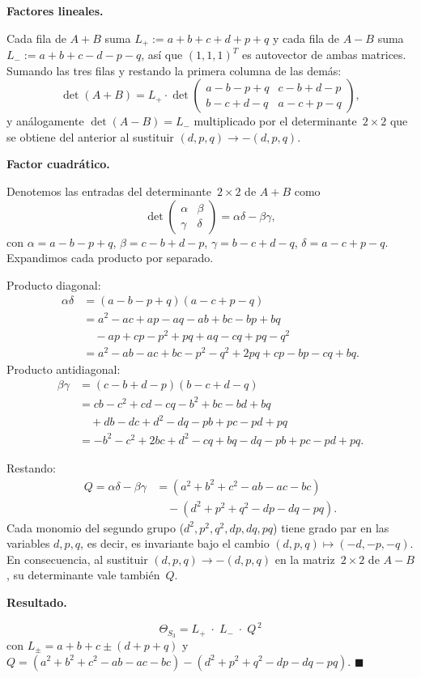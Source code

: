 \documentclass[10pt,a4paper]{article}
\newcommand{\blockhead}[2][repteal]{%
  \par\smallskip
  {\color{#1}\bfseries #2.}\par\nobreak\smallskip
}
\newcommand{\subhead}[1]{\blockhead{#1}}
\begin{document}
\subhead{Factores lineales}
Cada fila de $A+B$ suma $L_+:=a{+}b{+}c{+}d{+}p{+}q$
y cada fila de $A-B$ suma $L_-:=a{+}b{+}c{-}d{-}p{-}q$,
así que $(1,1,1)^{T}$ es autovector de ambas matrices.
Sumando las tres filas y restando la primera columna de las demás:
\[
  \det(A+B)=L_+\cdot\det
  \begin{pmatrix}
    a{-}b{-}p{+}q & c{-}b{+}d{-}p\\
    b{-}c{+}d{-}q & a{-}c{+}p{-}q
  \end{pmatrix},
\]
y análogamente $\det(A-B)=L_-$ multiplicado por el determinante~$2\times 2$
que se obtiene del anterior al sustituir $(d,p,q)\to-(d,p,q)$.

\subhead{Factor cuadrático}
Denotemos las entradas del determinante~$2\times 2$ de $A+B$ como
\[
  \det\begin{pmatrix}\alpha&\beta\\\gamma&\delta\end{pmatrix}
  =\alpha\delta-\beta\gamma,
\]
con $\alpha=a{-}b{-}p{+}q$, $\beta=c{-}b{+}d{-}p$,
$\gamma=b{-}c{+}d{-}q$, $\delta=a{-}c{+}p{-}q$.
Expandimos cada producto por separado.

Producto diagonal:
\begin{align*}
  \alpha\delta
  &= (a{-}b{-}p{+}q)(a{-}c{+}p{-}q)\\
  &= a^2-ac+ap-aq-ab+bc-bp+bq\\
  &\quad -ap+cp-p^2+pq+aq-cq+pq-q^2\\
  &= a^2-ab-ac+bc-p^2-q^2+2pq+cp-bp-cq+bq.
\end{align*}
Producto antidiagonal:
\begin{align*}
  \beta\gamma
  &= (c{-}b{+}d{-}p)(b{-}c{+}d{-}q)\\
  &= cb-c^2+cd-cq-b^2+bc-bd+bq\\
  &\quad +db-dc+d^2-dq-pb+pc-pd+pq\\
  &= -b^2-c^2+2bc+d^2-cq+bq-dq-pb+pc-pd+pq.
\end{align*}

Restando:
\begin{align*}
  Q = \alpha\delta-\beta\gamma
  &= (a^2+b^2+c^2-ab-ac-bc)\\
  &\quad -(d^2+p^2+q^2-dp-dq-pq).
\end{align*}
Cada monomio del segundo grupo ($d^2,p^2,q^2,dp,dq,pq$) tiene grado par
en las variables $d,p,q$, es decir, es invariante bajo el cambio
$(d,p,q)\mapsto(-d,-p,-q)$. En consecuencia, al sustituir
$(d,p,q)\to-(d,p,q)$ en la matriz~$2\times 2$ de $A-B$, su determinante
vale también~$Q$.

\subhead{Resultado}
\[
  \boxed{\;\Theta_{S_3}
  = L_+\;\cdot\; L_-\;\cdot\; Q^{\,2}\;}
\]
con $L_\pm=a{+}b{+}c\pm(d{+}p{+}q)$ y
$Q=(a^2{+}b^2{+}c^2{-}ab{-}ac{-}bc)-(d^2{+}p^2{+}q^2{-}dp{-}dq{-}pq)$.
\hfill$\blacksquare$
\enlargethispage{2\baselineskip}
\endgroup
\end{document}
